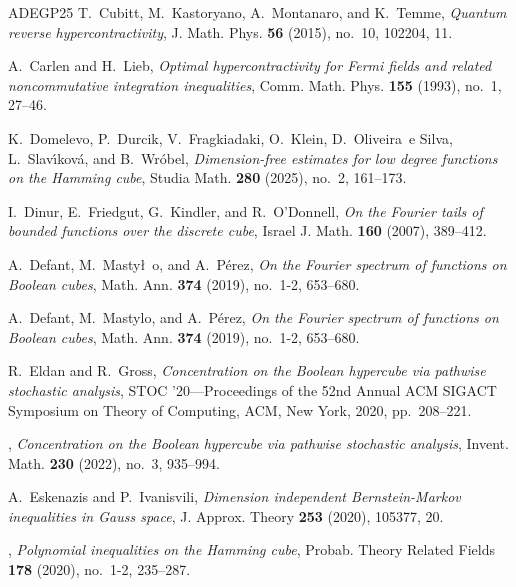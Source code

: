 \documentclass{amsbook}
\theoremstyle{definition}
\theoremstyle{remark}
\numberwithin{section}{chapter}
\numberwithin{equation}{chapter}
\newcommand{\1}{\mathbf{1}}
\begin{document}
\begin{thebibliography}{ADEGP25}
	T.~Cubitt, M.~Kastoryano, A.~Montanaro, and K.~Temme, \emph{Quantum reverse
		hypercontractivity}, J. Math. Phys. \textbf{56} (2015), no.~10, 102204, 11.
	
	A.~Carlen and H.~Lieb, \emph{Optimal hypercontractivity for {F}ermi fields and
		related noncommutative integration inequalities}, Comm. Math. Phys.
	\textbf{155} (1993), no.~1, 27--46. 
	
	K.~Domelevo, P.~Durcik, V.~Fragkiadaki, O.~Klein, D.~Oliveira~e Silva,
	L.~Slav\'{\i}kov\'{a}, and B.~Wr\'{o}bel, \emph{Dimension-free estimates for
		low degree functions on the {H}amming cube}, Studia Math. \textbf{280}
	(2025), no.~2, 161--173. 
	
	I.~Dinur, E.~Friedgut, G.~Kindler, and R.~O'Donnell, \emph{On the {F}ourier
		tails of bounded functions over the discrete cube}, Israel J. Math.
	\textbf{160} (2007), 389--412. 
	
	A.~Defant, M.~Masty\l~o, and A.~P\'erez, \emph{On the {F}ourier spectrum of
		functions on {B}oolean cubes}, Math. Ann. \textbf{374} (2019), no.~1-2,
	653--680. 
	
	A.~Defant, M.~Mastylo, and A.~P\'{e}rez, \emph{On the {F}ourier spectrum of
		functions on {B}oolean cubes}, Math. Ann. \textbf{374} (2019), no.~1-2,
	653--680. 
	
	R.~Eldan and R.~Gross, \emph{Concentration on the {B}oolean hypercube via
		pathwise stochastic analysis}, S{TOC} '20---{P}roceedings of the 52nd
	{A}nnual {ACM} {SIGACT} {S}ymposium on {T}heory of {C}omputing, ACM, New
	York, 2020, pp.~208--221.
	
	\bysame, \emph{Concentration on the {B}oolean hypercube via pathwise stochastic
		analysis}, Invent. Math. \textbf{230} (2022), no.~3, 935--994. 
	
	A.~Eskenazis and P.~Ivanisvili, \emph{Dimension independent
		{B}ernstein-{M}arkov inequalities in {G}auss space}, J. Approx. Theory
	\textbf{253} (2020), 105377, 20. 
	
	\bysame, \emph{Polynomial inequalities on the {H}amming cube}, Probab. Theory
	Related Fields \textbf{178} (2020), no.~1-2, 235--287. 
	

\end{thebibliography}
\end{document}
